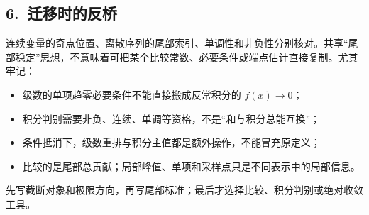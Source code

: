 \documentclass[UTF8,a4paper,10pt]{ctexart}
\begin{document}
\subsection*{6.\ 迁移时的反桥}
连续变量的奇点位置、离散序列的尾部索引、单调性和非负性分别核对。共享“尾部稳定”思想，不意味着可把某个比较常数、必要条件或端点估计直接复制。尤其牢记：
\begin{itemize}
  \item 级数的单项趋零必要条件不能直接搬成反常积分的 $f(x)\to0$；
  \item 积分判别需要非负、连续、单调等资格，不是“和与积分总能互换”；
  \item 条件抵消下，级数重排与积分主值都是额外操作，不能冒充原定义；
  \item 比较的是尾部总贡献；局部峰值、单项和采样点只是不同表示中的局部信息。
\end{itemize}
\begin{tcolorbox}[title=检查句]
先写截断对象和极限方向，再写尾部标准；最后才选择比较、积分判别或绝对收敛工具。
\end{tcolorbox}
\end{document}
